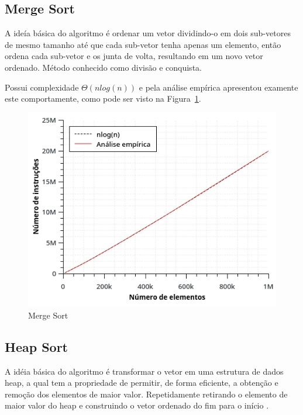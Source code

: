 \subsection{Merge Sort}
A ideía básica do algoritmo é ordenar um vetor dividindo-o em dois sub-vetores de mesmo tamanho até que cada sub-vetor tenha apenas um elemento, então ordena cada sub-vetor e os junta de volta, resultando em um novo vetor ordenado. Método conhecido como divisão e conquista.

Possui complexidade $\Theta(nlog(n))$ e pela análise empírica apresentou examente este comportamente, como pode ser visto na Figura~\ref{fig:merge}. 
\begin{figure}[ht]
\centering
\includegraphics[scale=0.7]{images/merge_graph.jpg}
\caption{Merge Sort}
\label{fig:merge}
\end{figure}

\subsection{Heap Sort}
A idéia básica do algoritmo é transformar o vetor em uma estrutura de dados heap, a qual tem a propriedade de permitir, de forma eficiente, a obtenção e remoção dos elementos de maior valor. Repetidamente retirando o elemento de maior valor do heap e construindo o vetor ordenado do fim para o início \cite{rosetta:01}.

